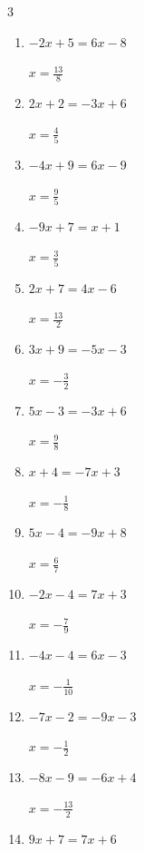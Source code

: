 \newpage
\resetdrill

\begin{multicols}{3}
\begin{enumerate}
  \itemsep=9pt
  \item $-2x+5=6x-8$

        $\displaystyle x=\frac{13}{8}$

  \item $2x+2=-3x+6$

        $\displaystyle x=\frac{4}{5}$

  \item $-4x+9=6x-9$

        $\displaystyle x=\frac{9}{5}$

  \item $-9x+7=x+1$

        $\displaystyle x=\frac{3}{5}$

  \item $2x+7=4x-6$

        $\displaystyle x=\frac{13}{2}$

  \item $3x+9=-5x-3$

        $\displaystyle x=-\frac{3}{2}$

  \item $5x-3=-3x+6$

        $\displaystyle x=\frac{9}{8}$

  \item $x+4=-7x+3$

        $\displaystyle x=-\frac{1}{8}$

  \item $5x-4=-9x+8$

        $\displaystyle x=\frac{6}{7}$

  \item $-2x-4=7x+3$

        $\displaystyle x=-\frac{7}{9}$

  \item $-4x-4=6x-3$

        $\displaystyle x=-\frac{1}{10}$

  \item $-7x-2=-9x-3$

        $\displaystyle x=-\frac{1}{2}$

  \item $-8x-9=-6x+4$

        $\displaystyle x=-\frac{13}{2}$

  \item $9x+7=7x+6$


\end{enumerate}
\end{multicols}
